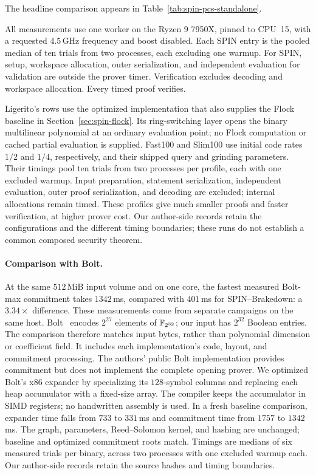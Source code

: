 The headline comparison appears in Table~\ref{tab:spin-pcs-standalone}.

All measurements use one worker on the Ryzen 9 7950X, pinned to CPU~15,
with a requested $4.5$\,GHz frequency and boost disabled. Each SPIN entry is
the pooled median of ten trials from two processes, each excluding one
warmup. For SPIN, setup, workspace allocation, outer serialization, and independent
evaluation for validation are outside the prover timer. Verification
excludes decoding and workspace allocation. Every timed proof verifies.

Ligerito's rows use the optimized implementation that also supplies the
Flock baseline in Section~\ref{sec:spin-flock}. Its ring-switching layer
opens the binary multilinear polynomial at an ordinary evaluation point;
no Flock computation or cached partial evaluation is supplied. Fast100
and Slim100 use initial code rates $1/2$ and $1/4$, respectively, and
their shipped query and grinding parameters. Their timings pool ten trials
from two processes per profile, each with one excluded warmup. Input
preparation, statement serialization, independent evaluation, outer proof
serialization, and decoding are excluded; internal allocations remain
timed. These profiles give much smaller proofs and faster verification,
at higher prover cost. Our author-side records retain the configurations and the
different timing boundaries; these runs do not establish a common
composed security theorem.

\paragraph{Comparison with Bolt.}
\label{app:bolt-estimate}
At the same $512$\,MiB input volume and on one core, the fastest measured
Bolt-max commitment takes $1342$\,ms, compared with $401$\,ms for
SPIN--Brakedown: a $3.34\times$ difference. These measurements come from
separate campaigns on the same host. Bolt~\cite{bolt26} encodes
$2^{27}$ elements of $\mathbb F_{2^{32}}$; our input has $2^{32}$ Boolean entries.
The comparison therefore matches input bytes, rather than polynomial
dimension or coefficient field. It includes each implementation's code,
layout, and commitment processing. The authors' public Bolt implementation
provides commitment but does not implement the complete opening prover.
We optimized Bolt's x86 expander by specializing its $128$-symbol columns
and replacing each heap accumulator with a fixed-size array.
The compiler keeps the accumulator in SIMD registers; no handwritten
assembly is used. In a fresh baseline comparison, expander time falls
from $733$ to $331$\,ms and commitment time from $1757$ to $1342$\,ms.
The graph, parameters, Reed--Solomon kernel, and hashing are unchanged;
baseline and optimized commitment roots match. Timings are medians of
six measured trials per binary, across two processes with one excluded
warmup each. Our author-side records retain the source hashes and timing boundaries.

